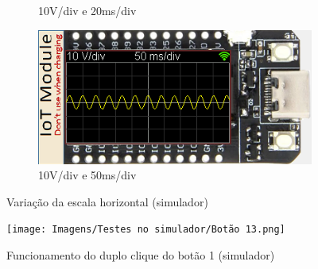 \begin{figure}[H]
\begin{subfigure}{0.35\textwidth}
        \captionsetup{justification=centering}
        \caption{10V/div e 20ms/div}
        \label{fig:10V/div e 20ms/div horizontal simulador}
    \end{subfigure}
    \begin{subfigure}{0.35\textwidth}
        \centering
        \includegraphics[width=1\linewidth]{Imagens/Testes no simulador/Horizontal 50ms.png}
        \captionsetup{justification=centering}
        \caption{10V/div e 50ms/div}
        \label{fig:10V/div e 50ms/div simulador}
    \end{subfigure}
    \captionsetup{justification=centering}
    \caption{Variação da escala horizontal (simulador)}
    \label{fig:Variação da escala horizontal (simulador)}
\end{figure}

\begin{figure}[H]
    \centering
    \texttt{[image: Imagens/Testes no simulador/Botão 13.png]}
    \captionsetup{justification=centering}
    \caption{Funcionamento do duplo clique do botão 1 (simulador)}
    \label{fig:Funcionamento do duplo clique do botão 1 (simulador)}
\end{figure}

